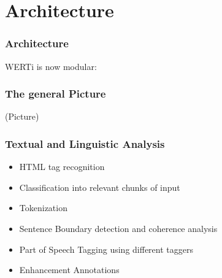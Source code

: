 \documentclass{beamer}
\begin{document}
\section{Architecture}
\begin{frame}
  \frametitle{Architecture}
  WERTi is now modular:
\end{frame}
\begin{frame}
  \frametitle{The general Picture}
  (Picture)
\end{frame}
\begin{frame}
  \frametitle{Textual and Linguistic Analysis}
  \begin{itemize}
    \item HTML tag recognition\pause
    \item Classification into relevant chunks of input\pause
    \item Tokenization\pause
    \item Sentence Boundary detection and coherence analysis\pause
    \item Part of Speech Tagging using different taggers\pause
    \item Enhancement Annotations\pause
  \end{itemize}
\end{frame}
\end{document}
